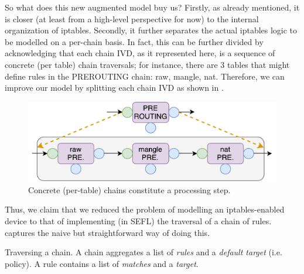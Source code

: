 So what does this new augmented model buy us?  Firstly, as already mentioned,
it is closer (at least from a high-level perspective for now) to the internal
organization of iptables.  Secondly, it further separates the actual iptables
logic to be modelled on a per-chain basis.  In fact, this can be further
divided by acknowledging that each chain IVD, as it represented here, is a
sequence of concrete (per table) chain traversals; for instance, there are 3
tables that might define rules in the PREROUTING chain: raw, mangle, nat.
Therefore, we can improve our model by splitting each chain IVD as shown in
.

\begin{figure}[h]
  \centering
  \captionsetup{justification=centering}
  \includegraphics[scale=0.5]{assets/img/iptables-2-composition}
  \caption{Concrete (per-table) chains constitute a processing step.}
  \label{fig:iptables-2-composition}
\end{figure}

Thus, we claim that we reduced the problem of modelling an iptables-enabled
device to that of implementing (in SEFL) the traversal of a chain of rules.
 captures the naive but
straightforward way of doing this.

\begin{algorithm}[H]

  \caption[Traversing a chain.]{Traversing a chain. A chain aggregates a list
  of \emph{rules} and a \emph{default target} (i.e. policy). A rule contains a
  list of \emph{matches} and a \emph{target}.}
  \label{algo:chain-traversal}
\end{algorithm}

